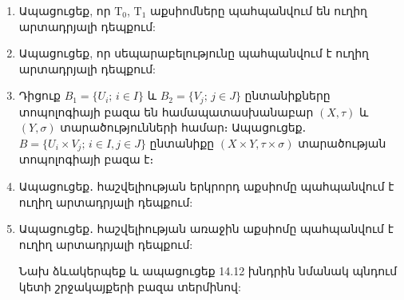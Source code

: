 \begin{enumerate}[label=\thesection.\arabic*., resume]

\item Ապացուցեք, որ $\textrm{T}_0$, $\textrm{T}_1$ աքսիոմները պահպանվում են ուղիղ արտադրյալի դեպ\-քում:

\item Ապացուցեք, որ սեպարաբելությունը պահպանվում է ուղիղ արտադրյալի դեպ\-քում:

\item Դիցուք $B_1=\{U_i;\, i \in I\}$ և $B_2=\{V_j;\, j \in J\}$ ընտանիքները տոպոլոգիայի բազա են համապատասխանաբար $(X, \tau)$ և $(Y, \sigma)$ տարածությունների հա\-մար։ Ապացուցեք․ $B=\{U_i \times V_j;\, i \in I, j \in J\}$ ընտանիքը $(X \times Y, \tau \times \sigma)$ տարածու\-թյան տոպոլոգիայի բազա է։

\item Ապացուցեք․ հաշվելիության երկրորդ աքսիոմը պահպանվում է ուղիղ ար\-տա\-դրյալի դեպքում:

\item Ապացուցեք․ հաշվելիության առաջին աքսիոմը պահպանվում է ուղիղ ար\-տա\-դրյալի դեպքում:

\begin{hint}
Նախ ձևակերպեք և ապացուցեք 14.12 խնդրին նմանակ պնդում կետի շրջակայքերի բազա տերմինով:
\end{hint}

\end{enumerate}
